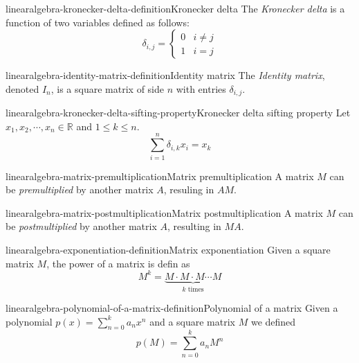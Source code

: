 \documentclass[preview]{standalone}
\begin{document}
\begin{snippetdefinition}{linearalgebra-kronecker-delta-definition}{Kronecker delta}{
    The \textit{Kronecker delta} is a function of two variables
    defined as follows:
    \[
        \delta_{i,j} = \begin{cases}
            0 & i \neq j \\
            1 & i = j
        \end{cases}
    \]
}
\end{snippetdefinition}

\begin{snippetdefinition}{linearalgebra-identity-matrix-definition}{Identity matrix}{
    The \textit{Identity matrix}, denoted \(I_n\),
    is a square matrix of side \(n\)
    with entries \(\delta_{i,j}\).
}
\end{snippetdefinition}

\begin{snippetproposition}{linearalgebra-kronecker-delta-sifting-property}{Kronecker delta sifting property}{
    Let \(x_1, x_2, \cdots, x_n \in \mathbb{R}\)
    and \(1 \leq k \leq n\).
    \[
        \sum_{i=1}^n \delta_{i,k}x_i = x_k
    \]
}
\end{snippetproposition}

\begin{snippetdefinition}{linearalgebra-matrix-premultiplication}{Matrix premultiplication}{
    A matrix \(M\) can be \textit{premultiplied}
    by another matrix \(A\), resuling in \(AM\).
}
\end{snippetdefinition}

\begin{snippetdefinition}{linearalgebra-matrix-postmultiplication}{Matrix postmultiplication}{
    A matrix \(M\) can be \textit{postmultiplied}
    by another matrix \(A\), resulting in \(MA\).
}
\end{snippetdefinition}

\begin{snippetdefinition}{linearalgebra-exponentiation-definition}{Matrix exponentiation}{
    Given a square matrix \(M\), the power of a matrix
    is defin as
    \[
        M^k = \underbrace{M\cdot M \cdot M \cdots M}_{k \text{ times}}
    \]
}
\end{snippetdefinition}

\begin{snippetdefinition}{linearalgebra-polynomial-of-a-matrix-definition}{Polynomial of a matrix}{
    Given a polynomial \(p(x)=\sum_{n=0}^k a_nx^n\)
    and a square matrix \(M\) we defined
    \[
        p(M) = \sum_{n=0}^k a_nM^n
    \]
}
\end{snippetdefinition}
\end{document}
